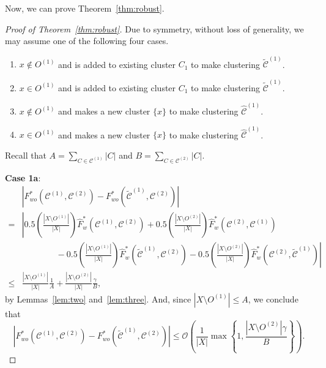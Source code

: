 \documentclass[11pt]{article}
\theoremstyle{remark}
\newcommand\cCone{\mathcal{C}^{(1)}}
\newcommand\tcCone{\tilde{\mathcal{C}}^{(1)}}
\newcommand\hcCone{\hat{\mathcal{C}}^{(1)}}
\newcommand\cCtwo{\mathcal{C}^{(2)}}
\newcommand{\bigO}{\mathcal{O}}
\begin{document}
Now, we can prove Theorem~\ref{thm:robust}.
\begin{proof}[Proof of Theorem~\ref{thm:robust}] 
    Due to symmetry, without loss of generality, we may assume one of the following four cases.
    \begin{enumerate}
        \item[1a.] $x \not \in O^{(1)}$ and is added to existing cluster $C_1$ to make clustering $\tcCone$.
        \item[1b.] $x \in O^{(1)}$ and is added to existing cluster $C_1$ to make clustering $\tcCone$.
        \item[2a.] $x \not \in O^{(1)}$ and makes a new cluster $\{x\}$ to make clustering $\hcCone$.
        \item[2b.] $x \in O^{(1)}$ and makes a new cluster $\{x\}$ to make clustering $\hcCone$.
    \end{enumerate}
    Recall that $A = \sum_{C \in \cCone} |C|$ and $B = \sum_{C \in \cCtwo} |C|$.

    \textbf{Case 1a}:
    \begin{align*}
        & \left| F^*_{wo}(\cCone, \cCtwo) - F^*_{wo}(\tcCone, \cCtwo) \right| \\
        = & \left| 0.5 \left( \frac{|X \setminus O^{(1)}|}{|X|} \right) \hat{F}^*_w(\cCone, \cCtwo) + 0.5 \left( \frac{| X \setminus O^{(2)}|}{|X|} \right) \hat{F}^*_w(\cCtwo, \cCone) \right. \\
        & \left. \qquad \qquad - 0.5 \left( \frac{|X \setminus O^{(1)}|}{|X|} \right) \hat{F}^*_w(\tcCone, \cCtwo) - 0.5 \left( \frac{|X \setminus O^{(2)}|}{|X|} \right) \hat{F}^*_w(\cCtwo, \tcCone) \right| \\
        \leq & \frac{|X \setminus O^{(1)}|}{|X|} \frac{1}{A} + \frac{|X \setminus O^{(2)}|}{|X|} \frac{ \gamma }{B},
    \end{align*}
    by Lemmas~\ref{lem:two} and~\ref{lem:three}.
    And, since $|X \setminus O^{(1)}| \leq A$, we conclude that
    \begin{equation*}
        \left| F^*_{wo}(\cCone, \cCtwo) - F^*_{wo}(\tcCone, \cCtwo) \right| \leq \bigO \left( \frac{1}{|X|} \max \left\{ 1, \frac{|X \setminus O^{(2)}| \gamma }{B} \right\} \right).
    \end{equation*}


\end{proof}
\end{document}
